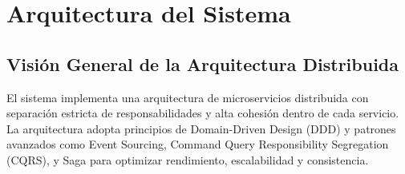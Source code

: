 
\section{Arquitectura del Sistema}
\label{sec:arquitectura}

\subsection{Visión General de la Arquitectura Distribuida}
\label{subsec:vision_general}

El sistema implementa una arquitectura de microservicios distribuida con separación estricta de responsabilidades y alta cohesión dentro de cada servicio. La arquitectura adopta principios de Domain-Driven Design (DDD) y patrones avanzados como Event Sourcing, Command Query Responsibility Segregation (CQRS), y Saga para optimizar rendimiento, escalabilidad y consistencia.

\vspace{0.3cm}

